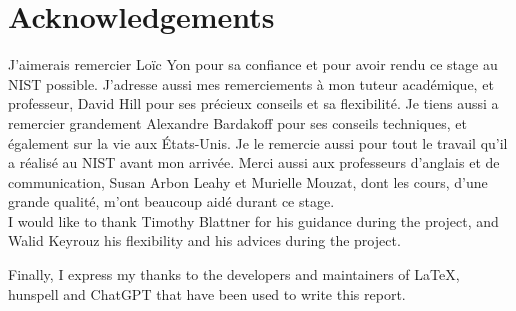 
\clearpage{}
\pagestyle{empty}
\section*{Acknowledgements}

J'aimerais remercier Loïc Yon pour sa confiance et pour avoir rendu ce stage au
NIST possible. J'adresse aussi mes remerciements à mon tuteur académique, et
professeur, David Hill pour ses précieux conseils et sa flexibilité. Je tiens
aussi a remercier grandement Alexandre Bardakoff pour ses conseils techniques,
et également sur la vie aux États-Unis. Je le remercie aussi pour tout le
travail qu'il a réalisé au NIST avant mon arrivée. Merci aussi aux professeurs
d'anglais et de communication, Susan Arbon Leahy et Murielle Mouzat, dont les
cours, d'une grande qualité, m'ont beaucoup aidé durant ce stage.\\

I would like to thank Timothy Blattner for his guidance during the project, and
Walid Keyrouz his flexibility and his advices during the project.

Finally, I express my thanks to the developers and maintainers of \LaTeX,
hunspell and ChatGPT that have been used to write this report.

\clearpage{}
